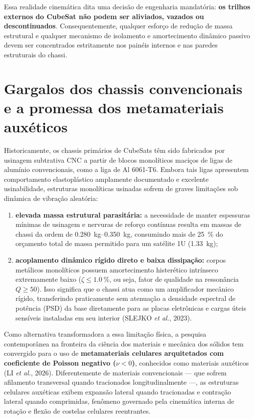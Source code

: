 Essa realidade cinemática dita uma decisão de engenharia mandatória: \textbf{os trilhos externos do CubeSat não podem ser aliviados, vazados ou descontinuados}. Consequentemente, qualquer esforço de redução de massa estrutural e qualquer mecanismo de isolamento e amortecimento dinâmico passivo devem ser concentrados estritamente nos painéis internos e nas paredes estruturais do chassi.

\section{Gargalos dos chassis convencionais e a promessa dos metamateriais auxéticos}
\label{sec:intro-metamateriais}

Historicamente, os chassis primários de CubeSats têm sido fabricados por usinagem subtrativa CNC a partir de blocos monolíticos maciços de ligas de alumínio convencionais, como a liga de Al 6061-T6. Embora tais ligas apresentem comportamento elastoplástico amplamente documentado e excelente usinabilidade, estruturas monolíticas usinadas sofrem de graves limitações sob dinâmica de vibração aleatória:
\begin{enumerate}
  \item \textbf{elevada massa estrutural parasitária:} a necessidade de manter espessuras mínimas de usinagem e nervuras de reforço contínuas resulta em massas de chassi da ordem de \SIrange{0.280}{0.350}{\kilo\gram}, consumindo mais de \SI{25}{\percent} do orçamento total de massa permitido para um satélite 1U (\SI{1.33}{\kilo\gram});
  \item \textbf{acoplamento dinâmico rígido direto e baixa dissipação:} corpos metálicos monolíticos possuem amortecimento histerético intrínseco extremamente baixo ($\zeta \le \SI{1.0}{\percent}$, ou seja, fator de qualidade na ressonância $Q \ge 50$). Isso significa que o chassi atua como um amplificador mecânico rígido, transferindo praticamente sem atenuação a densidade espectral de potência (PSD) da base diretamente para as placas eletrônicas e cargas úteis sensíveis instaladas em seu interior (SLEJKO \textit{et al.}, 2023).
\end{enumerate}

Como alternativa transformadora a essa limitação física, a pesquisa contemporânea na fronteira da ciência dos materiais e mecânica dos sólidos tem convergido para o uso de \textbf{metamateriais celulares arquitetados com coeficiente de Poisson negativo ($\nu < 0$)}, conhecidos como materiais auxéticos (LI \textit{et al.}, 2026). Diferentemente de materiais convencionais — que sofrem afilamento transversal quando tracionados longitudinalmente —, as estruturas celulares auxéticas exibem expansão lateral quando tracionadas e contração lateral quando comprimidas, fenômeno governado pela cinemática interna de rotação e flexão de costelas celulares reentrantes.

